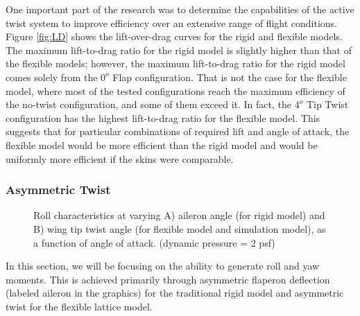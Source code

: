\documentclass[11pt]{ucthesis}
\begin{document}
One important part of the research was to determine the capabilities of the active twist system to improve efficiency over an extensive range of flight conditions. Figure \ref{fig:LD} shows the lift-over-drag curves for the rigid and flexible models. The maximum lift-to-drag ratio for the rigid model is slightly higher than that of the flexible models; however, the maximum lift-to-drag ratio for the rigid model comes solely from the $0^o$ Flap configuration. That is not the case for the flexible model, where most of the tested configurations reach the maximum efficiency of the no-twist configuration, and some of them exceed it. In fact, the $4^o$ Tip Twist configuration has the highest lift-to-drag ratio for the flexible model. This suggests that for particular combinations of required lift and angle of attack, the flexible model would be more efficient than the rigid model and would be uniformly more efficient if the skins were comparable.

\subsubsection{Asymmetric Twist}
\begin{figure}[thpb]
\hfill
{}
\hfill
{}
\hfill
\caption{Roll characteristics at varying A) aileron angle (for rigid model) and B) wing tip twist angle (for flexible model and simulation model), as a function of angle of attack. (dynamic pressure = 2 psf)}
\label{fig:Q2Roll}
\end{figure}

In this section, we will be focusing on the ability to generate roll and yaw moments. This is achieved primarily through asymmetric flaperon deflection (labeled aileron in the graphics) for the traditional rigid model and asymmetric twist for the flexible lattice model.
\end{document}
